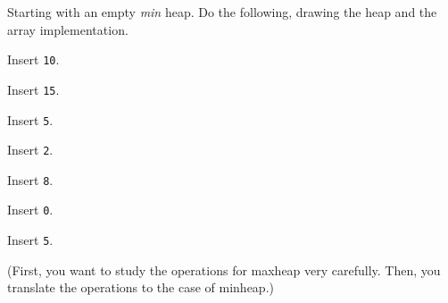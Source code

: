 Starting with an empty \textit{min} heap.
Do the following, drawing the heap and the array implementation.
\begin{tightlist}
  \item Insert \texttt{10}.
  \item Insert \texttt{15}.
  \item Insert \texttt{5}.
  \item Insert \texttt{2}.
  \item Insert \texttt{8}.
  \item Insert \texttt{0}.
  \item Insert \texttt{5}.
\end{tightlist}
(First, you want to study the operations for maxheap very carefully.
Then, you translate the operations to the case of minheap.)
